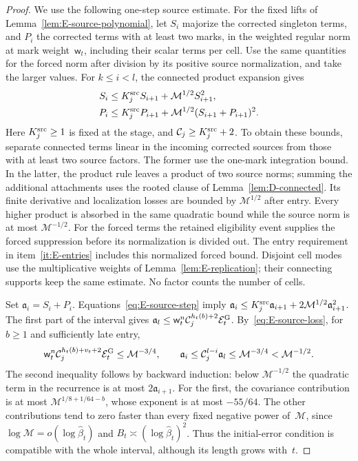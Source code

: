 \begin{proof}
We use the following one-step source estimate. For the fixed lifts of Lemma~\ref{lem:E-source-polynomial}, let $S_i$ majorize the corrected singleton terms, and $P_i$ the corrected terms with at least two marks, in the weighted regular norm at mark weight~$\mathsf w_t$, including their scalar terms per cell. Use the same quantities for the forced norm after division by its positive source normalization, and take the larger values. For $k\le i<l$, the connected product expansion gives
\begin{align}\label{eq:E-source-step}
 S_i&\le K_j^{\rm src} S_{i+1}+\mathcal M^{1/2}S_{i+1}^2,\notag\\
 P_i&\le K_j^{\rm src} P_{i+1}
          +\mathcal M^{1/2}(S_{i+1}+P_{i+1})^2.
\end{align}
Here $K_j^{\rm src}\ge1$ is fixed at the stage, and $\mathcal C_j\ge K_j^{\rm src}+2$. To obtain these bounds, separate connected terms linear in the incoming corrected sources from those with at least two source factors. The former use the one-mark integration bound. In the latter, the product rule leaves a product of two source norms; summing the additional attachments uses the rooted clause of Lemma~\ref{lem:D-connected}. Its finite derivative and localization losses are bounded by $\mathcal M^{1/2}$ after entry. Every higher product is absorbed in the same quadratic bound while the source norm is at most $\mathcal M^{-1/2}$. For the forced terms the retained eligibility event supplies the forced suppression before its normalization is divided out. The entry requirement in item~\ref{it:E-entries} includes this normalized forced bound. Disjoint cell modes use the multiplicative weights of Lemma~\ref{lem:E-replication}; their connecting supports keep the same estimate. No factor counts the number of cells.

Set $\mathfrak a_i=S_i+P_i$. Equations~\eqref{eq:E-source-step} imply $\mathfrak a_i\le K_j^{\rm src}\mathfrak a_{i+1}+2\mathcal M^{1/2}\mathfrak a_{i+1}^2$. The first part of the interval gives $\mathfrak a_l\le\mathsf w_t^n\mathcal C_j^{h_t(b)+2}\mathcal E_t^{\rm G}$. By~\eqref{eq:E-source-loss}, for $b\ge1$ and sufficiently late entry,
\begin{equation}\label{eq:E-source-iteration}
 \mathsf w_t^n\mathcal C_j^{h_t(b)+v_t+2}\mathcal E_t^{\rm G}
 \le\mathcal M^{-3/4},\qquad
 \mathfrak a_i\le\mathcal C_j^{l-i}\mathfrak a_l\le\mathcal M^{-3/4}<\mathcal M^{-1/2}.
\end{equation}
The second inequality follows by backward induction: below $\mathcal M^{-1/2}$ the quadratic term in the recurrence is at most $2\mathfrak a_{i+1}$. For the first, the covariance contribution is at most $\mathcal M^{1/8+1/64-b}$, whose exponent is at most $-55/64$. The other contributions tend to zero faster than every fixed negative power of~$\mathcal M$, since $\log\mathcal M=o(\log\widehat\beta_t)$ and $B_t\asymp(\log\widehat\beta_t)^2$. Thus the initial-error condition is compatible with the whole interval, although its length grows with~$t$.


\end{proof}
